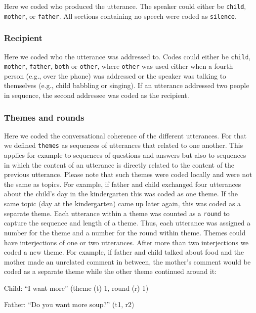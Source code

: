 \documentclass[
  man,floatsintext]{apa6}
\begin{document}
Here we coded who produced the utterance. The speaker could either be \texttt{child}, \texttt{mother}, or \texttt{father}. All sections containing no speech were coded as \texttt{silence}.

\hypertarget{recipient}{%
\subsubsection{Recipient}\label{recipient}}

Here we coded who the utterance was addressed to. Codes could either be \texttt{child}, \texttt{mother}, \texttt{father}, \texttt{both} or \texttt{other}, where \texttt{other} was used either when a fourth person (e.g., over the phone) was addressed or the speaker was talking to themselves (e.g., child babbling or singing). If an utterance addressed two people in sequence, the second addressee was coded as the recipient.

\hypertarget{themes-and-rounds}{%
\subsubsection{Themes and rounds}\label{themes-and-rounds}}

Here we coded the conversational coherence of the different utterances. For that we defined \texttt{themes} as sequences of utterances that related to one another. This applies for example to sequences of questions and answers but also to sequences in which the content of an utterance is directly related to the content of the previous utterance. Please note that such themes were coded locally and were not the same as topics. For example, if father and child exchanged four utterances about the child's day in the kindergarten this was coded as one theme. If the same topic (day at the kindergarten) came up later again, this was coded as a separate theme. Each utterance within a theme was counted as a \texttt{round} to capture the sequence and length of a theme. Thus, each utterance was assigned a number for the theme and a number for the round within theme. Themes could have interjections of one or two utterances. After more than two interjections we coded a new theme. For example, if father and child talked about food and the mother made an unrelated comment in between, the mother's comment would be coded as a separate theme while the other theme continued around it:

Child: ``I want more'' (theme (t) 1, round (r) 1)

Father: ``Do you want more soup?'' (t1, r2)
\end{document}

